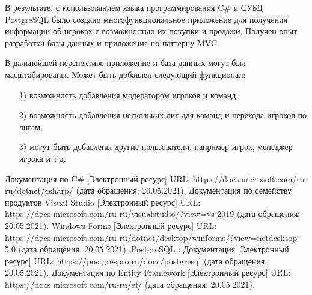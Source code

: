 В результате, с использованием языка программирования C\# и СУБД PostgreSQL было создано многофункциональное приложение для получения информации об игроках с возможностью их покупки и продажи. Получен опыт разработки базы данных и приложения по паттерну MVC. 

В дальнейшей перспективе приложение и база данных могут был масштабированы. Может быть добавлен следующий функционал:
\begin{itemize}
	\item[1)] возможность добавления модератором игроков и команд;
	\item[2)] возможность добавления нескольких лиг для команд и перехода игроков по лигам;
	\item[3)] могут быть добавлены другие пользователи, например игрок, менеджер игрока и т.д.
\end{itemize}

\clearpage
\begin{thebibliography}{9}
	 Документация по C\# [Электронный ресурс] URL: https://docs.microsoft.com/ru-ru/dotnet/csharp/ (дата обращения: 20.05.2021).
	 Документация по семейству продуктов Visual Studio [Электронный ресурс] URL: https://docs.microsoft.com/ru-ru/visualstudio/?view=vs-2019 (дата обращения: 20.05.2021).
	 Windows Forms [Электронный ресурс] URL: https://docs.microsoft.com/ru-ru/dotnet/desktop/winforms/?view=netdesktop-5.0 (дата обращения: 20.05.2021).
	 PostgreSQL : Документация [Электронный ресурс] URL: https://postgrespro.ru/docs/postgresql (дата обращения: 20.05.2021).
	 Документация по Entity Framework [Электронный ресурс] URL: https://docs.microsoft.com/ru-ru/ef/ (дата обращения: 20.05.2021).
\end{thebibliography}




